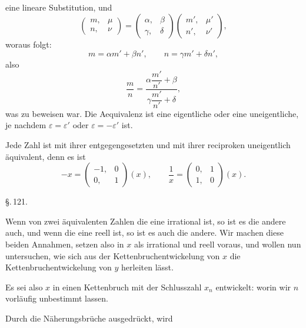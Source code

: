 eine lineare Substitution, und
\[
\begin{pmatrix}m, & \mu\\ n, & \nu\end{pmatrix} = \begin{pmatrix}\alpha, & \beta\\ \gamma, & \delta\end{pmatrix}\begin{pmatrix}m', & \mu'\\ n', & \nu'\end{pmatrix},
\]
woraus folgt:
\[
m = \alpha m' + \beta n', \qquad n = \gamma m' + \delta n',
\]
also
\[
\frac{m}{n} = \dfrac{\alpha\dfrac{m'}{n'}+\beta}{\gamma\dfrac{m'}{n'}+\delta},
\]
was zu beweisen war. Die Aequivalenz ist eine eigentliche oder eine uneigentliche, je nachdem $\varepsilon = \varepsilon'$ oder $\varepsilon = -\varepsilon'$ ist.

Jede Zahl ist mit ihrer entgegengesetzten und mit ihrer reciproken uneigentlich äquivalent, denn es ist
\[
-x = \begin{pmatrix}-1, & 0\\ 0, & 1\end{pmatrix}(x), \qquad \frac{1}{x} = \begin{pmatrix}0, & 1\\ 1, & 0\end{pmatrix}(x).
\]

\begin{center}
\S.\,121.

\end{center}

Wenn von zwei äquivalenten Zahlen die eine irrational ist, so ist es die andere auch, und wenn die eine reell ist, so ist es auch die andere. Wir machen diese beiden Annahmen, setzen also in
$x$ als irrational und reell voraus, und wollen nun untersuchen, wie sich aus der Kettenbruchentwickelung von $x$ die Kettenbruchentwickelung von $y$ herleiten lässt.

Es sei also $x$ in einen Kettenbruch mit der Schlusszahl $x_n$ entwickelt:
worin wir $n$ vorläufig unbestimmt lassen.

Durch die Näherungsbrüche ausgedrückt, wird
